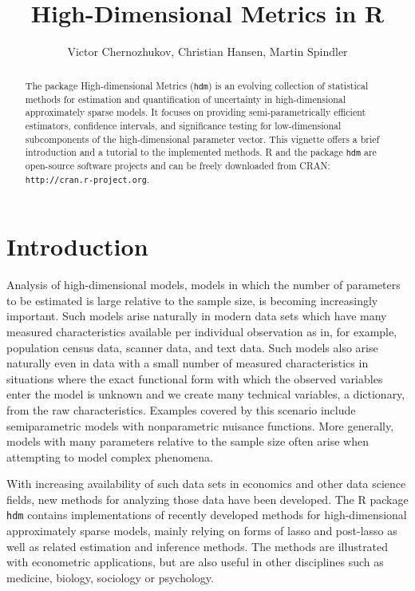 \documentclass{amsart}\usepackage[]{graphicx}\usepackage[]{color}
\title{High-Dimensional Metrics in R}
\author{Victor Chernozhukov, Christian Hansen, Martin Spindler}
\newcommand{\Rpackage}[1]{{\texttt{#1}}}
\newcommand{\R}{{\normalfont\textsf{R }}{}}
\begin{document}
\begin{abstract}
The package High-dimensional Metrics (\Rpackage{hdm}) is an evolving collection of statistical methods for estimation and quantification of uncertainty in high-dimensional approximately sparse models. It focuses on providing semi-parametrically efficient estimators, confidence intervals, and significance testing for low-dimensional subcomponents of the high-dimensional parameter vector. This vignette offers a brief introduction and a tutorial to the implemented methods.  \R and the package \Rpackage{hdm} are open-source software projects and can be freely downloaded from CRAN:
\texttt{http://cran.r-project.org}.
\end{abstract}

\maketitle

\pagestyle{myheadings}
\markboth{\sc High-Dimensional Metrics in \R}{\sc }

\tableofcontents
\section{Introduction}
Analysis of high-dimensional models, models in which the number of parameters to be estimated is large relative to the sample size, is becoming increasingly important. Such models arise naturally in modern data sets which have many measured characteristics available per individual observation as in, for example, population census data, scanner data, and text data.  Such models also arise naturally even in data with a small number of measured characteristics in situations where the exact functional form with which the observed variables enter the model is unknown and we create many technical variables, a dictionary, from the raw characteristics. Examples covered by this scenario include semiparametric models with nonparametric nuisance functions.  More generally, models with many parameters relative to the sample size often arise when attempting to model complex phenomena.

With increasing availability of such data sets in economics and other data science fields, new methods for analyzing those data have been developed. The \R package \Rpackage{hdm} contains implementations of recently developed methods for high-dimensional approximately sparse models, mainly relying on forms of lasso and post-lasso as well as related estimation and inference methods.  The methods are illustrated with econometric applications, but are also useful in other  disciplines such as medicine, biology, sociology or psychology. 
\end{document}
